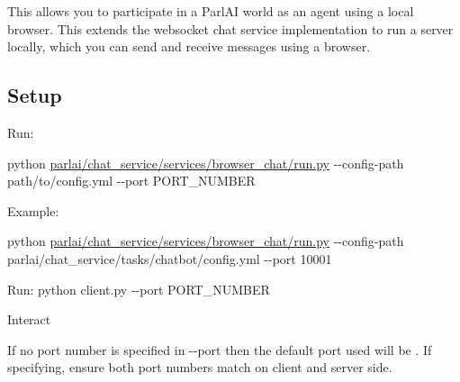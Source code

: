 This allows you to participate in a Parl\+AI world as an agent using a local browser. This extends the {\ttfamily websocket} chat service implementation to run a server locally, which you can send and receive messages using a browser.

\subsection*{Setup}


\begin{DoxyEnumerate}
\item Run\+:

{\ttfamily python \hyperlink{parlai_2chat__service_2services_2browser__chat_2run_8py}{parlai/chat\+\_\+service/services/browser\+\_\+chat/run.\+py} -\/-\/config-\/path path/to/config.\+yml -\/-\/port P\+O\+R\+T\+\_\+\+N\+U\+M\+B\+ER}

Example\+:

{\ttfamily python \hyperlink{parlai_2chat__service_2services_2browser__chat_2run_8py}{parlai/chat\+\_\+service/services/browser\+\_\+chat/run.\+py} -\/-\/config-\/path parlai/chat\+\_\+service/tasks/chatbot/config.\+yml -\/-\/port 10001}
\item Run\+: {\ttfamily python client.\+py -\/-\/port P\+O\+R\+T\+\_\+\+N\+U\+M\+B\+ER}
\item Interact
\end{DoxyEnumerate}

If no port number is specified in {\ttfamily -\/-\/port} then the default port used will be {}. If specifying, ensure both port numbers match on client and server side. 